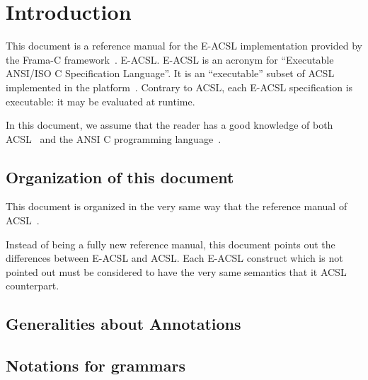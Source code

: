 \chapter{Introduction}

This document is a reference manual for
%
{the E-ACSL implementation provided by the Frama-C
  framework~\cite{frama-c}.}%
{E-ACSL.}
E-ACSL is an acronym for ``Executable ANSI/ISO C
Specification Language''. It is an ``executable'' subset of
ACSL~\cite{acsl} implemented in the \framac platform~\cite{framac}. Contrary to
ACSL, each E-ACSL specification is executable: it may be evaluated at runtime.

In this document, we assume that the reader has a good knowledge of both
ACSL~\cite{acsl} and the ANSI C programming language~\cite{KR88,standardc99}.

\section{Organization of this document}

This document is organized in the very same way that the reference manual of
ACSL~\cite{acsl}.

Instead of being a fully new reference manual, this document points out the
differences between E-ACSL and ACSL. Each E-ACSL construct which is not
pointed out must be considered to have the very same semantics that it ACSL
counterpart.

\section{Generalities about Annotations}\label{sec:gener-about-annot}
\nodiff

\section{Notations for grammars}
\nodiff
